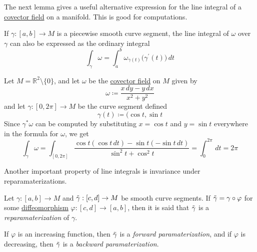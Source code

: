 \documentclass{article}
\newcounter{definition}[section]
\newcounter{example}[section]
\begin{document}
    The next lemma gives a useful alternative expression for the line integral of a \hyperref[def:covector-field]{covector field} on a manifold. This is good for computations.

    \begin{lemma}
      \label{thm:line-integral-over-a-piecewise-smooth-segment}
    If $\gamma: [a,b] \to M$ is a piecewise smooth curve segment, the line integral of $\omega$ over $\gamma$ can also be expressed as the ordinary integral 
    \begin{equation}
      \int_\gamma \omega = \int_a^b \omega_{\gamma(t)} \big( \gamma^\prime (t) \big)\,dt
    \end{equation}
    \end{lemma}

    \begin{example}
      \label{ex:the-angle-form-on-the-punctured-plane}
    Let $M = \mathbb{R}^2 \setminus \{0\}$, and let $\omega$ be the \hyperref[def:covector-field]{covector field} on $M$ given by
    \begin{equation}
      \omega \coloneqq \frac{x \,dy - y\,dx}{x^2 + y^2}
    \end{equation}
    and let $\gamma: [0, 2\pi] \to M$ be the curve segment defined 
    \begin{equation}
      \gamma(t) \coloneqq \big( \cos{t}, \sin{t}
    \end{equation}
    Since $\gamma^* \omega$ can be computed by substituting $x = \cos{t}$ and $y = \sin{t}$ everywhere in the formula for $\omega$, we get
    \begin{equation}
      \int_\gamma \omega = \int_{[0,2\pi]} \frac{\cos{t} (\cos{t}\,dt) - \sin{t} (-\sin{t}\,dt)}{\sin^2{t} + \cos^2{t}} = \int_0^{2\pi} \,dt = 2\pi
    \end{equation}
    \end{example}

    Another important property of line integrals is invariance under reparamaterizations.

    \begin{definition}[Reparameterization]
      \label{def:reparameterization}
    Let $\gamma: [a,b] \to M$ and $\Tilde{\gamma}: [c,d] \to M$ be smooth curve segments. If $\Tilde{\gamma} = \gamma \circ \varphi$ for some \hyperref[def:diffeomorphism-2]{diffeomorphism} $\varphi: [c,d] \to [a,b]$, then it is said that $\Tilde{\gamma}$ is a \textit{reparamaterization} of $\gamma$. 

    If $\varphi$ is an increasing function, then $\Tilde{\gamma}$ is a \textit{forward paramaterization}, and if $\varphi$ is decreasing, then $\Tilde{\gamma}$ is a \textit{backward paramaterization}. 
    \end{definition}
\end{document}
